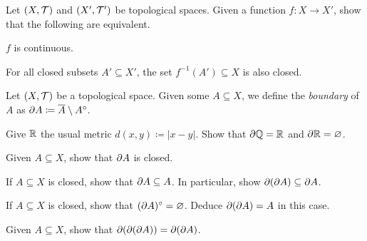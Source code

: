 \documentclass[../main.tex]{subfiles}
\begin{document}
\begin{homework}
    Let $(X,\mathcal{T})$ and $(X',\mathcal{T}')$ be topological spaces. Given a function $f\colon X\to X'$, show that the following are equivalent.
    \begin{listalph}
        \item $f$ is continuous.
        \item For all closed subsets $A'\subseteq X'$, the set $f^{-1}(A')\subseteq X$ is also closed.
    \end{listalph}
\end{homework}
\begin{homework}
    Let $(X,\mathcal{T})$ be a topological space. Given some $A\subseteq X$, we define the \textit{boundary} of $A$ as $\partial A\coloneqq\overline A\setminus A^\circ$.
    \begin{listalph}
        \item Give $\mathbb R$ the usual metric $d(x,y)\coloneqq|x-y|$. Show that $\partial\mathbb Q=\mathbb R$ and $\partial\mathbb R=\varnothing$.
        \item Given $A\subseteq X$, show that $\partial A$ is closed.
        \item If $A\subseteq X$ is closed, show that $\partial A\subseteq A$. In particular, show $\partial(\partial A)\subseteq\partial A$.
        \item If $A\subseteq X$ is closed, show that $(\partial A)^\circ=\varnothing$. Deduce $\partial(\partial A)=A$ in this case.
        \item Given $A\subseteq X$, show that $\partial(\partial(\partial A))=\partial(\partial A)$.
    \end{listalph}
\end{homework}
\end{document}
